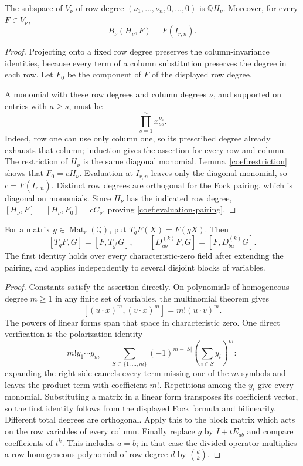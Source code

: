 \begin{lemma}\label{coef:extremal-weight}
The subspace of $V_\nu$ of row degree
$(\nu_1,\ldots,\nu_n,0,\ldots,0)$ is $\mathbb QH_\nu$.
Moreover, for every $F\in V_\nu$,
\begin{equation}\label{coef:evaluation-pairing}
                         B_\nu(H_\nu,F)=F(I_{r,n}).
\end{equation}
\end{lemma}
\begin{proof}
Projecting onto a fixed row degree preserves the column-invariance
identities, because every term of a column substitution preserves the
degree in each row. Let $F_0$ be the component of $F$ of the displayed
row degree.

A monomial with these row degrees and column degrees $\nu$, and
supported on entries with $a\ge s$, must be
\[
                         \prod_{s=1}^n x_{ss}^{\nu_s}.
\]
Indeed, row one can use only column one, so its prescribed degree
already exhausts that column; induction gives the assertion for every
row and column. The restriction of $H_\nu$ is the same diagonal
monomial. Lemma~\ref{coef:restriction} shows that
$F_0=cH_\nu$. Evaluation at $I_{r,n}$ leaves only the diagonal
monomial, so $c=F(I_{r,n})$.
Distinct row degrees are orthogonal for the Fock pairing, which is
diagonal on monomials. Since $H_\nu$ has the indicated row degree,
$[H_\nu,F]=[H_\nu,F_0]=cC_\nu$, proving
\eqref{coef:evaluation-pairing}.
\end{proof}

\begin{lemma}\label{coef:adjoint}
For a matrix $g\in\operatorname{Mat}_r(\mathbb Q)$, put
$T_gF(X)=F(gX)$. Then
\[
 [T_gF,G]=[F,T_{g^t}G],\qquad
 [D_{ab}^{(k)}F,G]=[F,D_{ba}^{(k)}G].
\]
The first identity holds over every characteristic-zero field after
extending the pairing, and applies independently to several disjoint
blocks of variables.
\end{lemma}
\begin{proof}
Constants satisfy the assertion directly. On polynomials of homogeneous
degree $m\ge1$ in any finite set of variables,
the multinomial theorem gives
\[
 [ (u\mathbin{\cdot}x)^m,(v\mathbin{\cdot}x)^m]
                         =m!(u\mathbin{\cdot}v)^m.
\]
The powers of linear forms span that space in characteristic zero.
One direct verification is the polarization identity
\[
 m!y_1\cdots y_m
  =\sum_{S\subset\{1,\ldots,m\}}(-1)^{m-|S|}
                               \left(\sum_{i\in S}y_i\right)^m:
\]
expanding the right side cancels every term missing one of the $m$
symbols and leaves the product term with coefficient $m!$.
Repetitions among the $y_i$ give every monomial. Substituting a matrix
in a linear form transposes its coefficient vector, so the first
identity follows from the displayed Fock formula and bilinearity.
Different total degrees are orthogonal. Apply this to the block matrix
which acts on the row variables of every column. Finally replace $g$
by $I+tE_{ab}$ and compare coefficients of $t^k$. This includes
$a=b$; in that case the divided operator multiplies a row-homogeneous
polynomial of row degree $d$ by $\binom dk$.
\end{proof}

